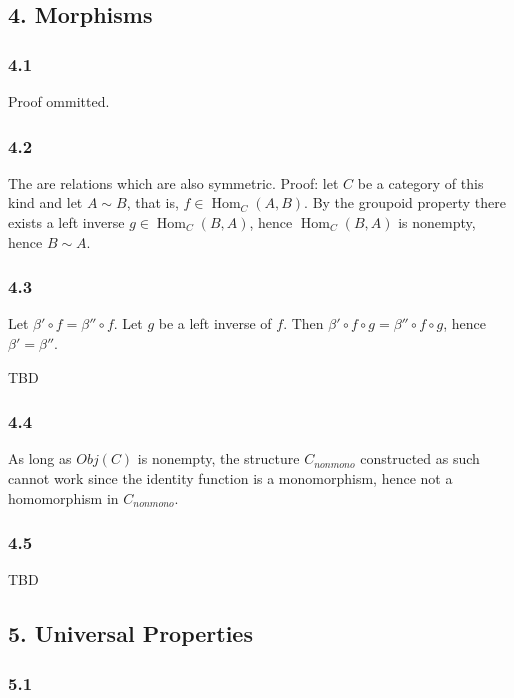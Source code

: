 \documentclass{article}
\DeclareMathOperator{\Hom}{Hom}
\begin{document}
\subsection*{4. Morphisms}

\subsubsection*{4.1}

Proof ommitted.

\subsubsection*{4.2}

The are relations which are also symmetric. Proof: let $C$ be a category of this kind and let $A \sim B$, that is, $f \in \Hom_C(A, B)$. By the groupoid property there exists a left inverse $g \in \Hom_C(B, A)$, hence $\Hom_C(B, A)$ is nonempty, hence $B \sim A$.

\subsubsection*{4.3}

Let $\beta' \circ f  = \beta'' \circ f$. Let $g$ be a left inverse of $f$. Then $\beta' \circ f \circ g = \beta'' \circ f \circ g$, hence $\beta' = \beta''$.

TBD

\subsubsection*{4.4}

As long as $Obj(C)$ is nonempty, the structure $C_{nonmono}$ constructed as such cannot work since the identity function is a monomorphism, hence not a homomorphism in $C_{nonmono}$.

\subsubsection*{4.5}

TBD

\subsection*{5. Universal Properties}

\subsubsection*{5.1}
\end{document}
